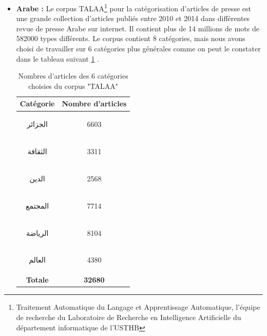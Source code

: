 \begin{itemize}
\begin{table}[H]
\begin{center}
                    \end{center}
                    \caption{Nombres d'articles de chaque catégorie du corpus "News"}
                    \label{news-categ}
                \end{table}
                \item{\textbf{Arabe : }}
                Le corpus TALAA\footnote{Traitement Automatique du Langage et Apprentissage Automatique, l'équipe de recherche du Laboratoire de Recherche en Intelligence Artificielle du département informatique de l'USTHB} pour la catégorisation d'articles de presse est une grande collection d'articles publiés entre 2010 et 2014 dans différentes revue de presse Arabe sur internet. Il contient plus de 14 millions de mots de 582000 types différents. Le corpus contient 8 catégories, mais nous avons choisi de travailler sur 6 catégories plus générales comme on peut le constater dans le tableau suivant \ref{talaa-categ} \cite{talaa}. 
                \begin{table}[H]
                    \begin{center}
                        \begin{tabular}{|c|c|}
                            \hline
                            \textbf{Catégorie} &  \textbf{Nombre d'articles} \\
                            \hline
                            \begin{arab}الجزائر\end{arab} & 6603 \\
                            \hline
                            \begin{arab}الثقافة\end{arab} & 3311 \\
                            \hline
                            \begin{arab}الدين\end{arab} & 2568 \\
                            \hline
                            \begin{arab}المجتمع\end{arab} & 7714 \\
                            \hline
                            \begin{arab}الرياضة\end{arab} & 8104 \\
                            \hline
                            \begin{arab}العالم\end{arab} & 4380 \\
                            \hline
                            \textbf{Totale} & \textbf{32680} \\
                            \hline
                        \end{tabular}
                    \end{center}
                    \caption{Nombres d'articles des 6 catégories choisies du corpus "TALAA"}
                    \label{talaa-categ}
                \end{table}
            \end{itemize}
